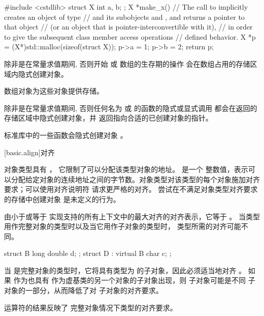 \pnum
\begin{example}
\begin{codeblock}
#include <cstdlib>
struct X { int a, b; };
X *make_x() {
  // The call to  implicitly creates an object of type 
  // and its subobjects  and , and returns a pointer to that  object
  // (or an object that is pointer-interconvertible with it),
  // in order to give the subsequent class member access operations
  // defined behavior.
  X *p = (X*)std::malloc(sizeof(struct X));
  p->a = 1;
  p->b = 2;
  return p;
}
\end{codeblock}
\end{example}

\pnum
除非是在常量求值期间,
否则开始  或  数组的生存期的操作
会在数组占用的存储区域内隐式创建对象。
\begin{note}
数组对象为这些对象提供存储。
\end{note}
除非是在常量求值期间,
否则任何名为  或  的函数的隐式或显式调用
都会在返回的存储区域中隐式创建对象，并
返回指向合适的已创建对象的指针。
\begin{note}
\Cpp{} 标准库中的一些函数会隐式创建对象%
。
\end{note}

[basic.align]{对齐}

\pnum
对象类型具有 ，
它限制了可以分配该类型对象的地址。  是一个 
整数值，表示可以分配给定对象的连续地址之间的字节数。对象类型对该类型的每个对象施加对齐
要求；可以使用对齐说明符 请求更严格的对齐。
尝试在不满足对象类型对齐要求的存储中创建对象
是未定义的行为。

\pnum
{} 由小于或等于
实现支持的所有上下文中的最大对齐的对齐表示，它等于
。
当类型用作完整对象的类型时以及当它用作子对象的类型时，
类型所需的对齐可能不同。
\begin{example}
\begin{codeblock}
struct B { long double d; };
struct D : virtual B { char c; };
\end{codeblock}

当  是完整对象的类型时，它将具有类型为  的子对象，因此必须适当地对齐
。
如果  作为也具有 
作为虚基类的另一个对象的子对象出现，则  子对象可能是不同
子对象的一部分，从而降低了对  子对象的对齐要求。
\end{example}
 运算符的结果反映了
完整对象情况下类型的对齐要求。


